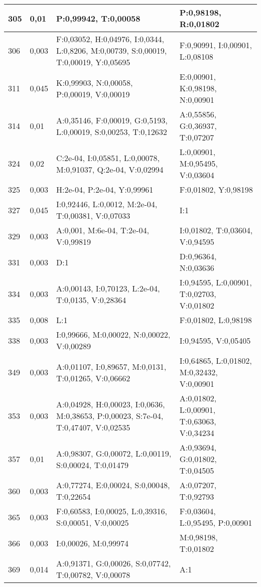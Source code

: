 \begin{landscape}
\begin{longtable}{|l|l|p{10.5cm}|p{10.5cm}|}
	305 & 0,01 & P:0,99942, T:0,00058 & P:0,98198, R:0,01802 \\ \hline 
	306 & 0,003 & F:0,03052, H:0,04976, I:0,0344, L:0,8206, M:0,00739, S:0,00019, T:0,00019, Y:0,05695 & F:0,90991, I:0,00901, L:0,08108 \\ \hline 
	311 & 0,045 & K:0,99903, N:0,00058, P:0,00019, V:0,00019 & E:0,00901, K:0,98198, N:0,00901 \\ \hline 
	314 & 0,01 & A:0,35146, F:0,00019, G:0,5193, L:0,00019, S:0,00253, T:0,12632 & A:0,55856, G:0,36937, T:0,07207 \\ \hline 
	324 & 0,02 & C:2e-04, I:0,05851, L:0,00078, M:0,91037, Q:2e-04, V:0,02994 & L:0,00901, M:0,95495, V:0,03604 \\ \hline 
	325 & 0,003 & H:2e-04, P:2e-04, Y:0,99961 & F:0,01802, Y:0,98198 \\ \hline 
	327 & 0,045 & I:0,92446, L:0,0012, M:2e-04, T:0,00381, V:0,07033 & I:1 \\ \hline 
	329 & 0,003 & A:0,001, M:6e-04, T:2e-04, V:0,99819 & I:0,01802, T:0,03604, V:0,94595 \\ \hline 
	331 & 0,003 & D:1 & D:0,96364, N:0,03636 \\ \hline 
	334 & 0,003 & A:0,00143, I:0,70123, L:2e-04, T:0,0135, V:0,28364 & I:0,94595, L:0,00901, T:0,02703, V:0,01802 \\ \hline 
	335 & 0,008 & L:1 & F:0,01802, L:0,98198 \\ \hline 
	338 & 0,003 & I:0,99666, M:0,00022, N:0,00022, V:0,00289 & I:0,94595, V:0,05405 \\ \hline 
	349 & 0,003 & A:0,01107, I:0,89657, M:0,0131, T:0,01265, V:0,06662 & I:0,64865, L:0,01802, M:0,32432, V:0,00901 \\ \hline 
	353 & 0,003 & A:0,04928, H:0,00023, I:0,0636, M:0,38653, P:0,00023, S:7e-04, T:0,47407, V:0,02535 & A:0,01802, L:0,00901, T:0,63063, V:0,34234 \\ \hline 
	357 & 0,01 & A:0,98307, G:0,00072, L:0,00119, S:0,00024, T:0,01479 & A:0,93694, G:0,01802, T:0,04505 \\ \hline 
	360 & 0,003 & A:0,77274, E:0,00024, S:0,00048, T:0,22654 & A:0,07207, T:0,92793 \\ \hline 
	365 & 0,003 & F:0,60583, I:0,00025, L:0,39316, S:0,00051, V:0,00025 & F:0,03604, L:0,95495, P:0,00901 \\ \hline 
	366 & 0,003 & I:0,00026, M:0,99974 & M:0,98198, T:0,01802 \\ \hline 
	369 & 0,014 & A:0,91371, G:0,00026, S:0,07742, T:0,00782, V:0,00078 & A:1 \\ \hline 

\end{longtable}
\end{landscape}

